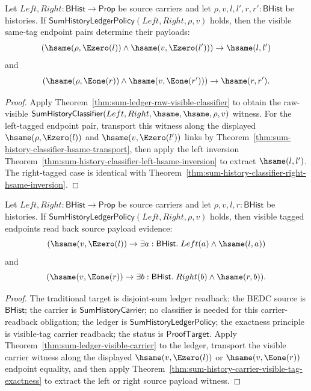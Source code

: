 \begin{theorem}
\label{thm:sum-ledger-same-tag-payload-exactness}
Let $Left,Right:\mathsf{BHist}\to\mathsf{Prop}$ be source carriers and let
$\rho,v,l,l',r,r':\mathsf{BHist}$ be histories. If
$\mathsf{SumHistoryLedgerPolicy}(Left,Right,\rho,v)$ holds, then the visible
same-tag endpoint pairs determine their payloads:
$$
(\hsame(\rho,\Ezero(l))\land\hsame(v,\Ezero(l')))\to\hsame(l,l')
$$
and
$$
(\hsame(\rho,\Eone(r))\land\hsame(v,\Eone(r')))\to\hsame(r,r').
$$
\end{theorem}
\begin{proof}
Apply Theorem~\ref{thm:sum-ledger-raw-visible-classifier} to obtain the
raw-visible $\mathsf{SumHistoryClassifier}(Left,Right,\hsame,\hsame,\rho,v)$
witness. For the left-tagged endpoint pair, transport this witness along the
displayed $\hsame(\rho,\Ezero(l))$ and $\hsame(v,\Ezero(l'))$ links by
Theorem~\ref{thm:sum-history-classifier-hsame-transport}, then apply the
left inversion Theorem~\ref{thm:sum-history-classifier-left-hsame-inversion}
to extract $\hsame(l,l')$. The right-tagged case is identical with
Theorem~\ref{thm:sum-history-classifier-right-hsame-inversion}.
\end{proof}

\begin{theorem}
\label{thm:sum-ledger-visible-payload-readback}
Let $Left,Right:\mathsf{BHist}\to\mathsf{Prop}$ be source carriers and let
$\rho,v,l,r:\mathsf{BHist}$ be histories. If
$\mathsf{SumHistoryLedgerPolicy}(Left,Right,\rho,v)$ holds, then visible tagged
endpoints read back source payload evidence:
$$
(\hsame(v,\Ezero(l))\to\exists a:\mathsf{BHist}.\;Left(a)\land\hsame(l,a))
$$
and
$$
(\hsame(v,\Eone(r))\to\exists b:\mathsf{BHist}.\;Right(b)\land\hsame(r,b)).
$$
\end{theorem}
\begin{proof}
The traditional target is disjoint-sum ledger readback; the BEDC source is
$\mathsf{BHist}$; the carrier is $\mathsf{SumHistoryCarrier}$; no classifier is
needed for this carrier-readback obligation; the ledger is
$\mathsf{SumHistoryLedgerPolicy}$; the exactness principle is visible-tag
carrier readback; the status is $\mathsf{ProofTarget}$. Apply
Theorem~\ref{thm:sum-ledger-visible-carrier} to the ledger, transport the visible
carrier witness along the displayed $\hsame(v,\Ezero(l))$ or
$\hsame(v,\Eone(r))$ endpoint equality, and then apply
Theorem~\ref{thm:sum-history-carrier-visible-tag-exactness} to extract the left
or right source payload witness.
\end{proof}

